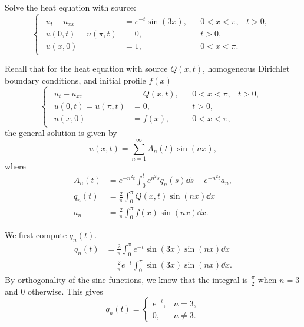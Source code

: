 \documentclass[plain]{pset}
\begin{document}
\pagebreak

\begin{problem}
Solve the heat equation with source:
\[
    \begin{cases}
        \begin{aligned}
            u_t - u_{xx}        & = e^{-t}\sin(3x), &  & 0 < x < \pi, & t > 0, \\
            u(0, t) = u(\pi, t) & = 0,              &  & t > 0,                \\
            u(x, 0)             & = 1,              &  & 0 < x < \pi.
        \end{aligned}
    \end{cases}
\]
\end{problem}
\begin{solution}
    Recall that for the heat equation with source \(Q(x,t)\), homogeneous Dirichlet boundary conditions, and initial profile \(f(x)\)
    \[
        \begin{cases}
            \begin{aligned}
                u_t - u_{xx}        & = Q(x,t), &  & 0 < x < \pi, & t > 0, \\
                u(0, t) = u(\pi, t) & = 0,      &  & t > 0,                \\
                u(x, 0)             & = f(x),   &  & 0 < x < \pi,
            \end{aligned}
        \end{cases}
    \]
    the general solution is given by
    \[u(x,t) = \sum_{n=1}^\infty A_n(t)\sin(nx),\]
    where
    \begin{align*}
        A_n(t) & = e^{-n^2t}\int_0^t e^{n^2s}q_n(s) \dd{s} + e^{-n^2t}a_n, \\
        q_n(t) & = \frac{2}{\pi}\int_0^\pi Q(x,t)\sin(nx) \dd{x}           \\
        a_n    & = \frac{2}{\pi}\int_0^\pi f(x)\sin(nx) \dd{x}.
    \end{align*}

    We first compute \(q_n(t)\).
    \begin{align*}
        q_n(t) & = \frac{2}{\pi}\int_0^\pi e^{-t}\sin(3x)\sin(nx) \dd{x}  \\
               & = \frac{2}{\pi}e^{-t}\int_0^\pi \sin(3x)\sin(nx) \dd{x}.
    \end{align*}
    By orthogonality of the sine functions, we know that the integral is \(\frac{\pi}{2}\) when \(n = 3\) and 0 otherwise. This gives
    \[
        q_n(t) = \begin{cases}
            e^{-t}, & n = 3,    \\
            0,      & n \neq 3.
        \end{cases}
    \]


\end{solution}
\end{document}
